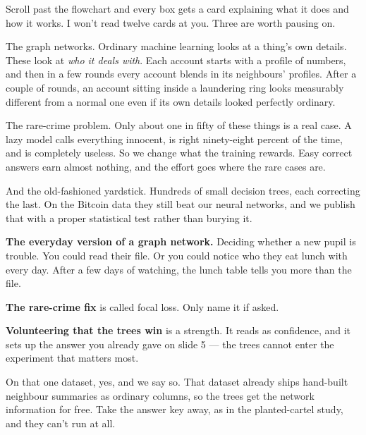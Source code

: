 \documentclass[11pt]{article}
\begin{document}


\begin{saythis}
Scroll past the flowchart and every box gets a card explaining what it does and
how it works. I won't read twelve cards at you. Three are worth pausing on.

The graph networks. Ordinary machine learning looks at a thing's own details.
These look at \emph{who it deals with}. Each account starts with a profile of
numbers, and then in a few rounds every account blends in its neighbours'
profiles. After a couple of rounds, an account sitting inside a laundering ring
looks measurably different from a normal one \bt even if its own details looked
perfectly ordinary.

The rare-crime problem. Only about one in fifty of these things is a real case.
A lazy model calls everything innocent, is right ninety-eight percent of the
time, and is completely useless. So we change what the training rewards. Easy
correct answers earn almost nothing, and the effort goes where the rare cases
are.

And the old-fashioned yardstick. Hundreds of small decision trees, each
correcting the last. On the Bitcoin data they still beat our neural networks,
and we publish that with a proper statistical test rather than burying it.
\end{saythis}

\begin{means}
\textbf{The everyday version of a graph network.} Deciding whether a new pupil
is trouble. You could read their file. Or you could notice who they eat lunch
with every day. After a few days of watching, the lunch table tells you more
than the file.

\textbf{The rare-crime fix} is called focal loss. Only name it if asked.

\textbf{Volunteering that the trees win} is a strength. It reads as confidence,
and it sets up the answer you already gave on slide 5 --- the trees cannot
enter the experiment that matters most.
\end{means}

\begin{asked}
 On that
one dataset, yes, and we say so. That dataset already ships hand-built
neighbour summaries as ordinary columns, so the trees get the network
information for free. Take the answer key away, as in the planted-cartel study,
and they can't run at all.
\end{asked}
\end{document}
